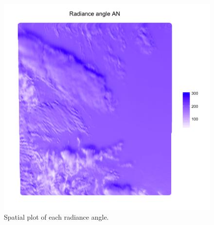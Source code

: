 \documentclass[11pt]{article}\usepackage[]{graphicx}\usepackage[]{color}
\newenvironment{knitrout}{}{} %
\begin{document}
\begin{knitrout}
\begin{figure}[]
\includegraphics[width=0.49\linewidth]{figure/plot-radiance-5} \caption[Spatial plot of each radiance angle]{Spatial plot of each radiance angle.\label{fig:plot-radiance}}
\end{figure}


\end{knitrout}
\end{document}
